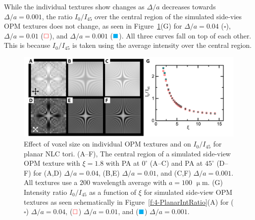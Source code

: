 While the individual textures show changes as $\Delta /a$ decreases towards $\Delta /a = 0.001$, the ratio $I_0/I_{45}$ over the central region of the simulated side-vies OPM textures does not change, as seen in Figure~\ref{f:4-PlanarVoxel}(G) for $\Delta /a = 0.04$ ($\square$), $\Delta /a = 0.01$ (${\color{red}\square}$), and $\Delta /a = 0.001$ (${\color{cyan}\blacksquare}$).
All three curves fall on top of each other.
This is because $I_0/I_{45}$ is taken using the average intensity over the central region.
\begin{figure}
\centering
\includegraphics{figures/C4/Ch4-Figs_SimDeltaTest.png}
\caption{Effect of voxel size on individual OPM textures and on $I_0/I_{45}$ for planar NLC tori.
(A--F), The central region of a simulated side-view OPM texture with $\xi = 1.8$ with PA at $0^{\circ}$ (A--C) and PA at $45^{\circ}$ (D--F) for (A,D) $\Delta /a = 0.04$, (B,E) $\Delta /a = 0.01$, and (C,F) $\Delta /a = 0.001$.
All textures use a $200$ wavelength average with $a = 100$ $\upmu$m.
(G) Intensity ratio $I_0/I_{45}$ as a function of $\xi$ for simulated side-view OPM textures as seen schematically in Figure~\ref{f:4-PlanarIntRatio}(A) for ($\square$) $\Delta /a = 0.04$, (${\color{red}\square}$) $\Delta /a = 0.01$, and (${\color{cyan}\blacksquare}$) $\Delta /a = 0.001$.
}\label{f:4-PlanarVoxel}
\end{figure}


